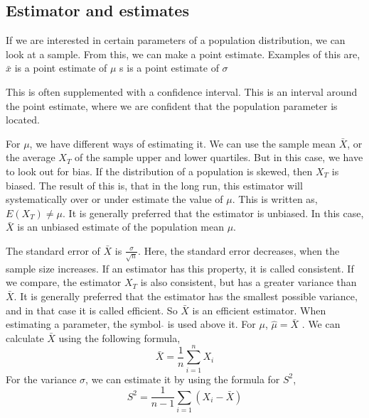 \subsection{Estimator and estimates}
If we are interested in certain parameters of a population distribution, we can look at a sample. From this, we can make a point estimate. 
\newline
Examples of this are, 
\newline
$\bar{x}$ is a point estimate of $\mu$
\newline
s is a point estimate of $\sigma$
\newline

\noindent This is often supplemented with a confidence interval.
\newline
This is an interval around the point estimate, where we are confident that the population parameter is located.
\newline

\noindent For $\mu$, we have different ways of estimating it. We can use the sample mean $\bar{X}$, or the average $X_T$ of the sample upper and lower quartiles. 
But in this case, we have to look out for bias. If the distribution of a population is skewed, then $X_T$ is biased. The result of this is, that in the long run, this estimator will systematically over or under estimate the value of $\mu$. This is written as,
\newline
$E(X_T) \neq \mu$.
\newline
It is generally preferred that the estimator is unbiased. In this case, $\bar{X}$ is an unbiased estimate of the population mean $\mu$.
\newline

\noindent The standard error of $\bar{X}$ is $\frac{\sigma}{\sqrt{n}}$. Here, the standard error decreases, when the sample size increases. If an estimator has this property, it is called consistent. If we compare, the estimator $X_T$ is also consistent, but has a greater variance than $\bar{X}$. 
\newline
It is generally preferred that the estimator has the smallest possible variance, and in that case it is called efficient. So $\bar{X}$ is an efficient estimator.
\newline
When estimating a parameter, the symbol $\hat{}$ is used above it. For $\mu$, $\hat{\mu} = \bar{X}$ .
\newline
We can calculate $\bar{X}$ using the following formula,
$$\bar{X}=\frac{1}{n} \sum_{i=1}^{n}X_i$$   
\newline
For the variance $\sigma$, we can estimate it by using the formula for $S^2$,
$$S^2=\frac{1}{n-1} \sum_{i=1}(X_i-\bar{X})$$
